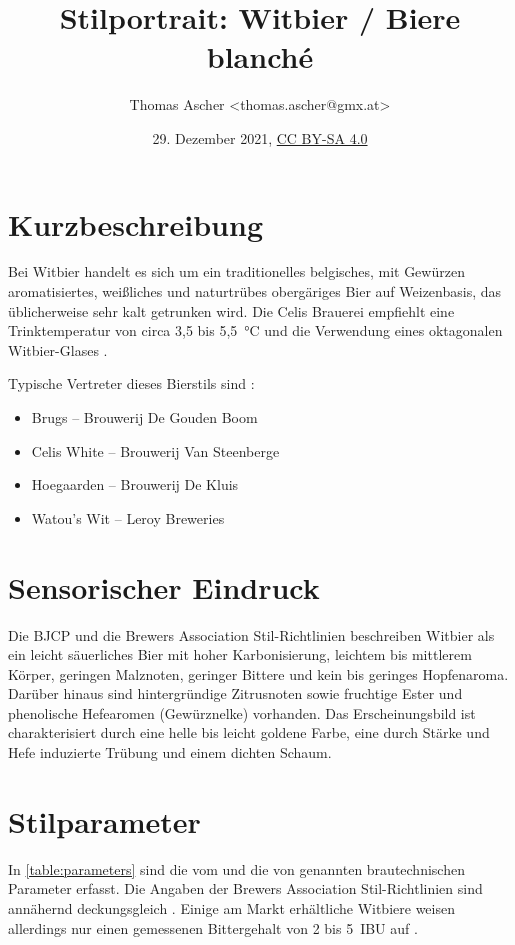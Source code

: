 \documentclass[a4paper,parskip=half]{scrartcl}
\title{Stilportrait: Witbier / Biere blanché}
\author{Thomas Ascher <thomas.ascher@gmx.at>}
\date{29. Dezember 2021, \href{http://creativecommons.org/licenses/by-sa/4.0/}{CC BY-SA 4.0}}
\begin{document}
\maketitle

\section*{Kurzbeschreibung}

Bei Witbier handelt es sich um ein traditionelles belgisches, mit Gewürzen
aromatisiertes, weißliches und naturtrübes obergäriges Bier auf Weizenbasis, das
üblicherweise sehr kalt getrunken wird. \parencite[1\psq]{Strottner1999}
Die Celis Brauerei empfiehlt eine Trinktemperatur von circa 3,5 bis 5,5~°C
und die Verwendung eines oktagonalen Witbier-Glases \parencite{CelisBrewery2021}.

Typische Vertreter dieses Bierstils sind \parencite{Roncoroni2018}:

\begin{itemize}
\item Brugs – Brouwerij De Gouden Boom
\item Celis White – Brouwerij Van Steenberge
\item Hoegaarden – Brouwerij De Kluis
\item Watou's Wit – Leroy Breweries
\end{itemize}

\section*{Sensorischer Eindruck}

Die BJCP und die Brewers Association Stil-Richtlinien beschreiben
Witbier als ein leicht säuerliches Bier mit hoher Karbonisierung,
leichtem bis mittlerem Körper, geringen Malznoten, geringer Bittere
und kein bis geringes Hopfenaroma. Darüber hinaus sind hintergründige
Zitrusnoten sowie fruchtige Ester und phenolische Hefearomen (Gewürznelke)
vorhanden. Das Erscheinungsbild ist charakterisiert durch eine helle
bis leicht goldene Farbe, eine durch Stärke und Hefe induzierte Trübung
und einem dichten Schaum. \parencites[48\psq]{BJCP2015}[24]{BA2021}

\section*{Stilparameter}

In \autoref{table:parameters} sind die vom \citeauthor{BJCP2015} und die von
\citeauthor{Strottner1999} genannten brautechnischen Parameter erfasst.
Die Angaben der Brewers Association Stil-Richtlinien sind annähernd
deckungsgleich \parencites[24]{BA2021}. Einige am Markt erhältliche
Witbiere weisen allerdings nur einen gemessenen Bittergehalt von
2 bis 5~IBU auf \parencite{Roncoroni2018}.
\end{document}
